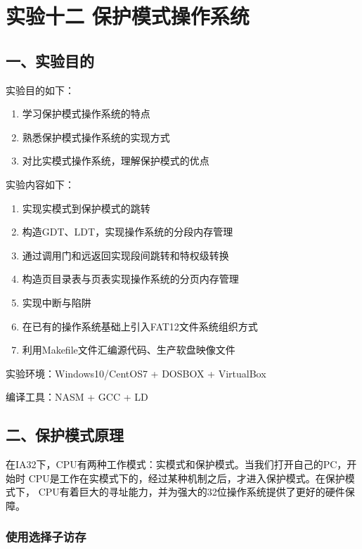 \documentclass[12pt,a4paper,UTF8]{ctexart}
\begin{document}
\section*{实验十二 \quad 保护模式操作系统}

\subsection*{一、实验目的}

\noindent 实验目的如下：

\renewcommand{\labelenumi}{(\theenumi)}
\begin{enumerate}
\item 学习保护模式操作系统的特点
\item 熟悉保护模式操作系统的实现方式
\item 对比实模式操作系统，理解保护模式的优点
\end{enumerate}

\noindent 实验内容如下：

\begin{enumerate}
\item 实现实模式到保护模式的跳转
\item 构造GDT、LDT，实现操作系统的分段内存管理
\item 通过调用门和远返回实现段间跳转和特权级转换
\item 构造页目录表与页表实现操作系统的分页内存管理
\item 实现中断与陷阱
\item 在已有的操作系统基础上引入FAT12文件系统组织方式
\item 利用Makefile文件汇编源代码、生产软盘映像文件
\end{enumerate}

\noindent 实验环境：Windows10/CentOS7 + DOSBOX + VirtualBox

\noindent 编译工具：NASM + GCC + LD

\subsection*{二、保护模式原理}

在IA32下，CPU有两种工作模式：实模式和保护模式。当我们打开自己的PC，开始时
CPU是工作在实模式下的，经过某种机制之后，才进入保护模式。在保护模式下，
CPU有着巨大的寻址能力，并为强大的32位操作系统提供了更好的硬件保障。

\subsubsection*{使用选择子访存}
\end{document}
